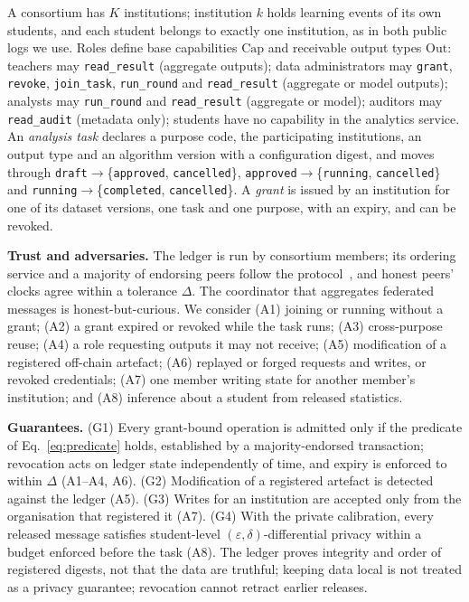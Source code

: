 \documentclass[pdflatex,iicol,sn-mathphys-num]{sn-jnl}
\theoremstyle{thmstyleone}
\begin{document}
A consortium has $K$ institutions; institution $k$ holds learning events of its own students, and each student belongs to exactly one institution, as in both public logs we use. Roles define base capabilities $\mathrm{Cap}$ and receivable output types $\mathrm{Out}$: teachers may \texttt{read\_result} (aggregate outputs); data administrators may \texttt{grant}, \texttt{revoke}, \texttt{join\_task}, \texttt{run\_round} and \texttt{read\_result} (aggregate or model outputs); analysts may \texttt{run\_round} and \texttt{read\_result} (aggregate or model); auditors may \texttt{read\_audit} (metadata only); students have no capability in the analytics service. An \emph{analysis task} declares a purpose code, the participating institutions, an output type and an algorithm version with a configuration digest, and moves through \texttt{draft}$\to$\{\texttt{approved}, \texttt{cancelled}\}, \texttt{approved}$\to$\{\texttt{running}, \texttt{cancelled}\} and \texttt{running}$\to$\{\texttt{completed}, \texttt{cancelled}\}. A \emph{grant} is issued by an institution for one of its dataset versions, one task and one purpose, with an expiry, and can be revoked.

\textbf{Trust and adversaries.} The ledger is run by consortium members; its ordering service and a majority of endorsing peers follow the protocol~\cite{androulaki2018hyperledger}, and honest peers' clocks agree within a tolerance $\Delta$. The coordinator that aggregates federated messages is honest-but-curious. We consider (A1) joining or running without a grant; (A2) a grant expired or revoked while the task runs; (A3) cross-purpose reuse; (A4) a role requesting outputs it may not receive; (A5) modification of a registered off-chain artefact; (A6) replayed or forged requests and writes, or revoked credentials; (A7) one member writing state for another member's institution; and (A8) inference about a student from released statistics.

\textbf{Guarantees.} (G1) Every grant-bound operation is admitted only if the predicate of Eq.~\eqref{eq:predicate} holds, established by a majority-endorsed transaction; revocation acts on ledger state independently of time, and expiry is enforced to within $\Delta$ (A1--A4, A6). (G2) Modification of a registered artefact is detected against the ledger (A5). (G3) Writes for an institution are accepted only from the organisation that registered it (A7). (G4) With the private calibration, every released message satisfies student-level $(\varepsilon,\delta)$-differential privacy within a budget enforced before the task (A8). The ledger proves integrity and order of registered digests, not that the data are truthful; keeping data local is not treated as a privacy guarantee; revocation cannot retract earlier releases.
\end{document}
